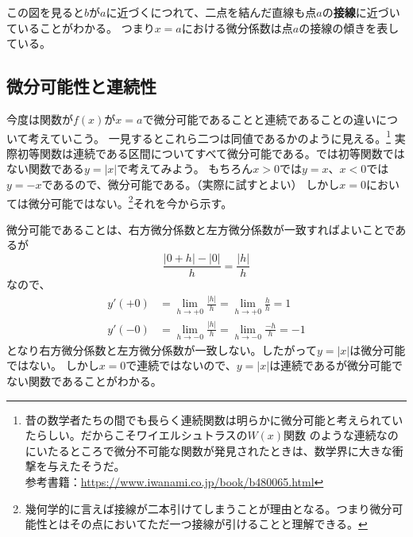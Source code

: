 \documentclass[a4j,dvipdfmx]{jsarticle}
\begin{document}
            この図を見ると$b$が$a$に近づくにつれて、二点を結んだ直線も点$a$の\textbf{接線}に近づいていることがわかる。
            つまり$x=a$における微分係数は点$a$の接線の傾きを表している。
        \clearpage
        \subsection{微分可能性と連続性}
            今度は関数が$f(x)$が$x=a$で微分可能であることと連続であることの違いについて考えていこう。
            一見するとこれら二つは同値であるかのように見える。\footnote{昔の数学者たちの間でも長らく連続関数は明らかに微分可能と考えられていたらしい。だからこそワイエルシュトラスの$W(x)$関数
            のような連続なのにいたるところで微分不可能な関数が発見されたときは、数学界に大きな衝撃を与えたそうだ。\\参考書籍：\url{https://www.iwanami.co.jp/book/b480065.html}}
            実際初等関数は連続である区間についてすべて微分可能である。では初等関数ではない関数である$y=|x|$で考えてみよう。
            もちろん$x>0$では$y=x$、$x<0$では$y=-x$であるので、微分可能である。（実際に試すとよい）
            しかし$x=0$においては微分可能ではない。\footnote{幾何学的に言えば接線が二本引けてしまうことが理由となる。つまり微分可能性とはその点においてただ一つ接線が引けることと理解できる。\label{微分可能性の幾何学的意味}}それを今から示す。

            微分可能であることは、右方微分係数と左方微分係数が一致すればよいことであるが
            \begin{equation}
                \frac{|0+h|-|0|}{h}=\frac{|h|}{h}
            \end{equation}
            なので、
            \begin{align}
                y'(+0)&=\lim_{h\to +0}\frac{|h|}{h}=\lim_{h\to+0}\frac{h}{h}=1\\
                y'(-0)&=\lim_{h\to -0}\frac{|h|}{h}=\lim_{h\to -0}\frac{-h}{h}=-1
            \end{align}
            となり右方微分係数と左方微分係数が一致しない。したがって$y=|x|$は微分可能ではない。
            しかし$x=0$で連続ではないので、$y=|x|$は連続であるが微分可能でない関数であることがわかる。
\end{document}
